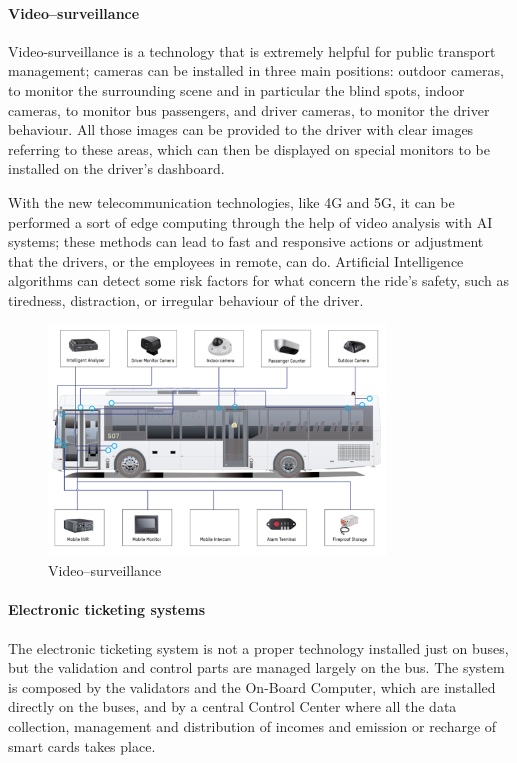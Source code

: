 \paragraph{Video–surveillance }
Video-surveillance is a technology that is extremely helpful for public transport management; cameras can be installed in three main positions: outdoor cameras, to monitor the surrounding scene and in particular the blind spots, indoor cameras, to monitor bus passengers, and driver cameras, to monitor the driver behaviour. All those images can be provided to the driver with clear images referring to these areas, which can then be displayed on special monitors to be installed on the driver's dashboard. 

With the new telecommunication technologies, like 4G and 5G, it can be performed a sort of edge computing through the help of video analysis with AI systems; these methods can lead to fast and responsive actions or adjustment that the drivers, or the employees in remote, can do. Artificial Intelligence algorithms can detect some risk factors for what concern the ride’s safety, such as tiredness, distraction, or irregular behaviour of the driver.

\begin{figure}[h!]
    \centering
    \includegraphics[width=0.8\textwidth]{Images/New Technologies/VIDEOSURV.PNG}
    \caption{Video–surveillance}
    \label{fig:vs}
\end{figure}


\paragraph{Electronic ticketing systems}
The electronic ticketing system is not a proper technology installed just on buses, but the validation and control parts are managed largely on the bus. The system is composed by the validators and the On-Board Computer, which are installed directly on the buses, and by a central Control Center where all the data collection, management and distribution of incomes and emission or recharge of smart cards takes place.

